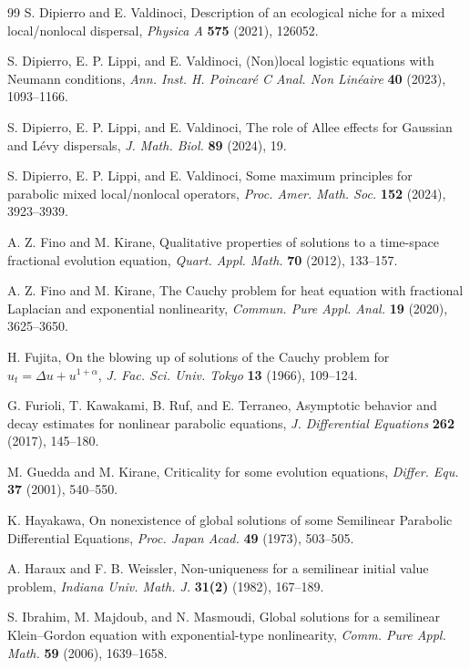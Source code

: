 \documentclass[a4paper,11pt]{amsart}
\numberwithin{equation}{section}
\theoremstyle{plain}
\theoremstyle{definition}
\begin{document}
\begin{thebibliography}{99}
S. Dipierro and E. Valdinoci,
Description of an ecological niche for a mixed local/nonlocal dispersal,
\emph{Physica A} \textbf{575} (2021), 126052.

S. Dipierro, E. P. Lippi, and E. Valdinoci,
(Non)local logistic equations with Neumann conditions,
\emph{Ann. Inst. H. Poincar\'e C Anal. Non Lin\'eaire} \textbf{40} (2023), 1093--1166.

S. Dipierro, E. P. Lippi, and E. Valdinoci,
The role of Allee effects for Gaussian and L\'evy dispersals,
\emph{J. Math. Biol.} \textbf{89} (2024), 19.

S. Dipierro, E. P. Lippi, and E. Valdinoci,
Some maximum principles for parabolic mixed local/nonlocal operators,
\emph{Proc. Amer. Math. Soc.} \textbf{152} (2024), 3923--3939.

A. Z. Fino and M. Kirane,
Qualitative properties of solutions to a time-space fractional evolution equation,
\emph{Quart. Appl. Math.} \textbf{70} (2012), 133--157.

A. Z. Fino and M. Kirane,
The Cauchy problem for heat equation with fractional Laplacian and exponential nonlinearity,
\emph{Commun. Pure Appl. Anal.} \textbf{19} (2020), 3625--3650.

H. Fujita,
On the blowing up of solutions of the Cauchy problem for $u_t=\Delta u+u^{1+\alpha}$,
\emph{J. Fac. Sci. Univ. Tokyo} \textbf{13} (1966), 109--124.

G. Furioli, T. Kawakami, B. Ruf, and E. Terraneo,
Asymptotic behavior and decay estimates for nonlinear parabolic equations,
\emph{J. Differential Equations} \textbf{262} (2017), 145--180.

M. Guedda and M. Kirane,
Criticality for some evolution equations,
\emph{Differ. Equ.} \textbf{37} (2001), 540--550.

K. Hayakawa,
On nonexistence of global solutions of some Semilinear Parabolic Differential Equations,
\emph{Proc. Japan Acad.} \textbf{49} (1973), 503--505.

A. Haraux and F. B. Weissler,
Non-uniqueness for a semilinear initial value problem,
\emph{Indiana Univ. Math. J.} \textbf{31(2)} (1982), 167--189.

S. Ibrahim, M. Majdoub, and N. Masmoudi,
Global solutions for a semilinear Klein--Gordon equation with exponential-type nonlinearity,
\emph{Comm. Pure Appl. Math.} \textbf{59} (2006), 1639--1658.


\end{thebibliography}
\end{document}
